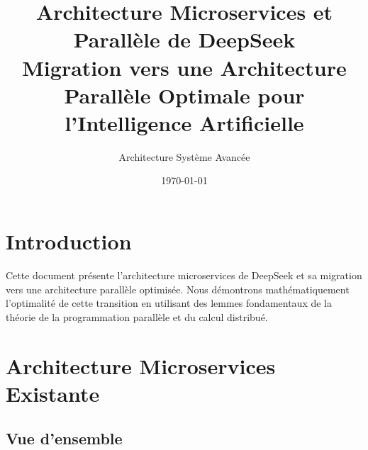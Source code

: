 \documentclass[12pt,a4paper]{article}
\title{\textbf{Architecture Microservices et Parallèle de DeepSeek} \\ 
       \large Migration vers une Architecture Parallèle Optimale pour l'Intelligence Artificielle}
\author{Architecture Système Avancée}
\date{\today}
\begin{document}
\maketitle
\tableofcontents
\newpage

\section{Introduction}

Cette document présente l'architecture microservices de DeepSeek et sa migration vers une architecture parallèle optimisée. Nous démontrons mathématiquement l'optimalité de cette transition en utilisant des lemmes fondamentaux de la théorie de la programmation parallèle et du calcul distribué.

\section{Architecture Microservices Existante}

\subsection{Vue d'ensemble}
\end{document}

